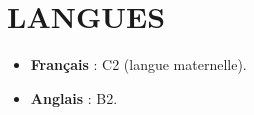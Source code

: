 \section{LANGUES}

\vspace{0.75cm}

\begin{itemize}
  \item \textbf{Français} : C2 (langue maternelle).
  \item \textbf{Anglais} : B2.
\end{itemize}
